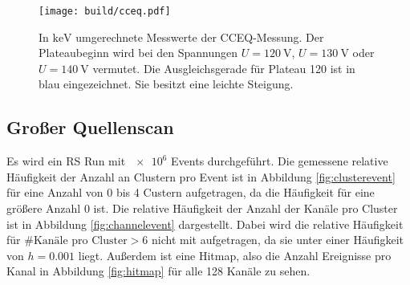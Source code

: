 \begin{figure}
  \centering
  \texttt{[image: build/cceq.pdf]}
  \caption{In $\si{\kilo\electronvolt}$ umgerechnete Messwerte der CCEQ-Messung. Der Plateaubeginn wird bei den Spannungen $U = \SI{120}{\volt}$, $U = \SI{130}{\volt}$ oder
  $U = \SI{140}{\volt}$ vermutet. Die Ausgleichsgerade für Plateau 120 ist in blau eingezeichnet. Sie besitzt eine leichte Steigung.}
  \label{fig:cceq}
\end{figure}

\subsection{Großer Quellenscan}

Es wird ein RS Run mit $\num{e6}$ Events durchgeführt. Die gemessene relative
Häufigkeit der Anzahl an Clustern pro Event ist in Abbildung \ref{fig:clusterevent} für eine Anzahl von 0 bis 4
Custern aufgetragen, da die Häufigkeit für eine größere Anzahl 0 ist. Die relative Häufigkeit der Anzahl der Kanäle pro Cluster ist
in Abbildung \ref{fig:channelevent} dargestellt. Dabei wird die relative Häufigkeit für $\# \text{Kanäle pro Cluster} > 6$
nicht mit aufgetragen, da sie unter einer Häufigkeit von $h = 0.001$ liegt. Außerdem ist eine Hitmap, also die Anzahl
Ereignisse pro Kanal in Abbildung \ref{fig:hitmap} für alle 128 Kanäle zu sehen.

